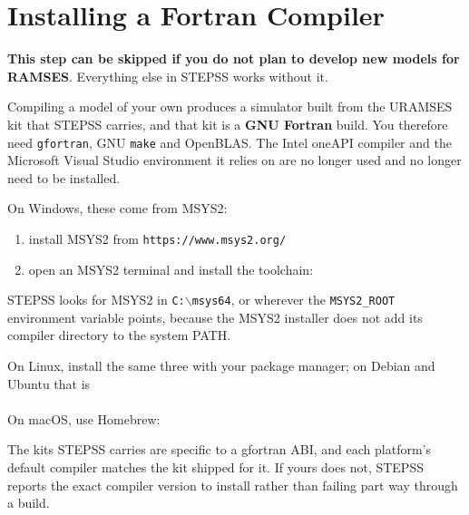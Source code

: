 \section{Installing a Fortran Compiler}

{\bf \large This step can be skipped if you do not plan to develop new models for RAMSES}. Everything else in STEPSS works without it.

Compiling a model of your own produces a simulator built from the URAMSES kit that STEPSS carries, and that kit is a {\bf GNU Fortran} build. You therefore need {\tt gfortran}, GNU {\tt make} and OpenBLAS. The Intel oneAPI compiler and the Microsoft Visual Studio environment it relies on are no longer used and no longer need to be installed.

On Windows, these come from MSYS2:
\begin{enumerate}
\item install MSYS2 from {\tt https://www.msys2.org/}
\item open an MSYS2 terminal and install the toolchain:\\
\hspace*{5ex}{\tt pacman -S mingw-w64-x86\_64-gcc-fortran mingw-w64-x86\_64-openblas make}
\end{enumerate}

STEPSS looks for MSYS2 in {\tt C:$\backslash$msys64}, or wherever the {\tt MSYS2\_ROOT} environment variable points, because the MSYS2 installer does not add its compiler directory to the system PATH.

On Linux, install the same three with your package manager; on Debian and Ubuntu that is\\
\hspace*{5ex}{\tt sudo apt install gfortran make libopenblas-dev}\\
On macOS, use Homebrew:\\
\hspace*{5ex}{\tt brew install gcc openblas}

The kits STEPSS carries are specific to a gfortran ABI, and each platform's default compiler matches the kit shipped for it. If yours does not, STEPSS reports the exact compiler version to install rather than failing part way through a build.
